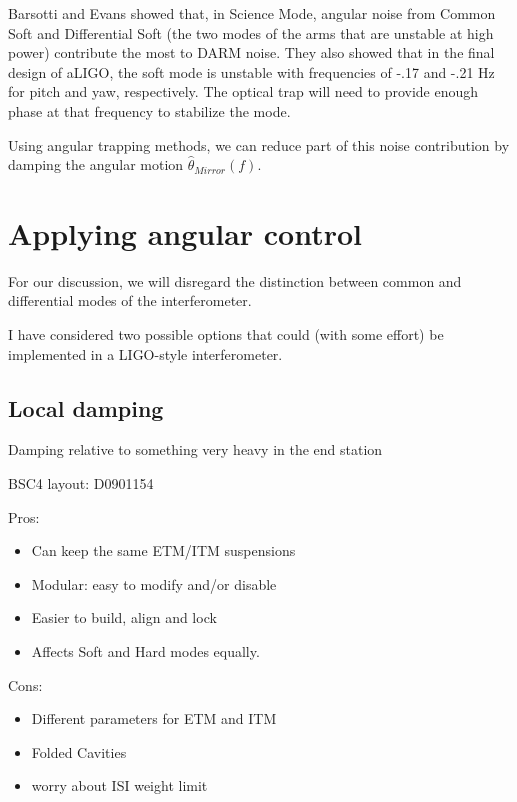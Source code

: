 Barsotti and Evans showed that, in Science Mode, angular noise from Common Soft and Differential Soft (the two modes of the arms that are unstable at high power) contribute the most to DARM noise. They also showed that in the final design of aLIGO, the soft mode is unstable with frequencies of -.17 and -.21 Hz for pitch and yaw, respectively. The optical trap will need to provide enough phase at that frequency to stabilize the mode.

Using angular trapping methods, we can reduce part of this noise contribution by damping the angular motion $\hat{\theta}_{Mirror}(f)$.

\section{Applying angular control}

For our discussion, we will disregard the distinction between common and differential modes of the interferometer.

I have considered two possible options that could (with some effort) be implemented in a LIGO-style interferometer.

\subsection{Local damping}

Damping relative to something very heavy in the end station

BSC4 layout: D0901154

Pros:

\begin{itemize}
	\item Can keep the same ETM/ITM suspensions
	\item Modular: easy to modify and/or disable
	\item Easier to build, align and lock
	\item Affects Soft and Hard modes equally.
\end{itemize}

Cons:
\begin{itemize}
  \item	Different parameters for ETM and ITM
	\item Folded Cavities
	\item worry about ISI weight limit
\end{itemize}



